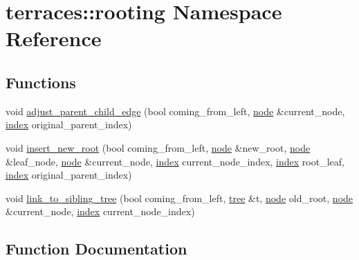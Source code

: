 \hypertarget{namespaceterraces_1_1rooting}{}\section{terraces\+:\+:rooting Namespace Reference}
\label{namespaceterraces_1_1rooting}
\subsection*{Functions}
\begin{DoxyCompactItemize}
\item 
void \hyperlink{namespaceterraces_1_1rooting_a4b0a3f334477b7cc4fcc0f4a53dc43f6}{adjust\+\_\+parent\+\_\+child\+\_\+edge} (bool coming\+\_\+from\+\_\+left, \hyperlink{structterraces_1_1node}{node} \&current\+\_\+node, \hyperlink{namespaceterraces_adbc33ccb543d1634e96d0eb02e472c77}{index} original\+\_\+parent\+\_\+index)
\item 
void \hyperlink{namespaceterraces_1_1rooting_a5fa10e038e438e5d9eb672bdaec413ea}{insert\+\_\+new\+\_\+root} (bool coming\+\_\+from\+\_\+left, \hyperlink{structterraces_1_1node}{node} \&new\+\_\+root, \hyperlink{structterraces_1_1node}{node} \&leaf\+\_\+node, \hyperlink{structterraces_1_1node}{node} \&current\+\_\+node, \hyperlink{namespaceterraces_adbc33ccb543d1634e96d0eb02e472c77}{index} current\+\_\+node\+\_\+index, \hyperlink{namespaceterraces_adbc33ccb543d1634e96d0eb02e472c77}{index} root\+\_\+leaf, \hyperlink{namespaceterraces_adbc33ccb543d1634e96d0eb02e472c77}{index} original\+\_\+parent\+\_\+index)
\item 
void \hyperlink{namespaceterraces_1_1rooting_a27b5d633461a2008842a40402a9cb1c0}{link\+\_\+to\+\_\+sibling\+\_\+tree} (bool coming\+\_\+from\+\_\+left, \hyperlink{namespaceterraces_a07aaf7feec4a22c6cdefc14c5a81bdd0}{tree} \&t, \hyperlink{structterraces_1_1node}{node} old\+\_\+root, \hyperlink{structterraces_1_1node}{node} \&current\+\_\+node, \hyperlink{namespaceterraces_adbc33ccb543d1634e96d0eb02e472c77}{index} current\+\_\+node\+\_\+index)
\end{DoxyCompactItemize}


\subsection{Function Documentation}
\mbox{\label{namespaceterraces_1_1rooting_a4b0a3f334477b7cc4fcc0f4a53dc43f6}} 
